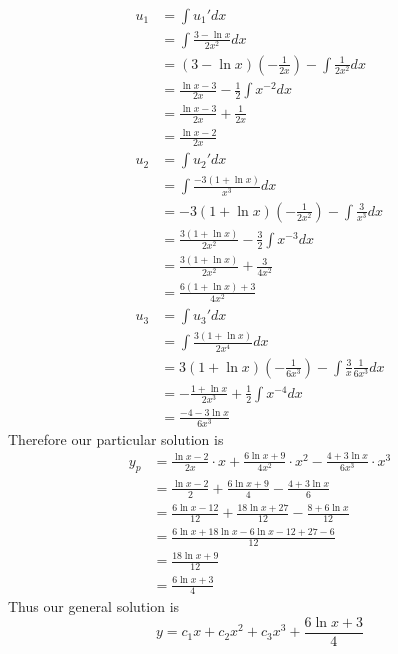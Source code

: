 \documentclass[openany]{report}
\begin{document}
\begin{align*}
    u_1 &= \int u_1'dx\\
    &= \int \frac{3-\ln x}{2x^2}dx\\
    &= (3-\ln x)\left(-\frac{1}{2x}\right) - \int \frac{1}{2x^2}dx\\
    &= \frac{\ln x - 3}{2x} - \frac{1}{2}\int x^{-2}dx\\
    &= \frac{\ln x - 3}{2x} + \frac{1}{2x}\\
    &= \frac{\ln x - 2}{2x}\\
    u_2 &= \int u_2'dx\\
    &= \int \frac{-3(1+\ln x)}{x^3}dx\\
    &= -3(1+\ln x)\left(-\frac{1}{2x^2}\right) - \int \frac{3}{x^3}dx\\
    &= \frac{3(1+\ln x)}{2x^2} - \frac{3}{2}\int x^{-3}dx\\
    &= \frac{3(1+ \ln x)}{2x^2} + \frac{3}{4x^2}\\
    &= \frac{6 (1 + \ln x) + 3 }{4x^2}\\
    u_3 &= \int u_3'dx\\
    &= \int \frac{3(1+\ln x)}{2x^4}dx\\
    &= 3(1 + \ln x) \left(-\frac{1}{6x^3}\right) - \int \frac{3}{x}\frac{1}{6x^3}dx\\
    &= -\frac{1 + \ln x}{2x^3} + \frac{1}{2}\int x^{-4}dx\\
    &= \frac{-4-3\ln x}{6x^3}
\end{align*}
Therefore our particular solution is
\begin{align*}
    y_p &= \frac{\ln x - 2}{2x} \cdot x + \frac{6\ln x + 9}{4x^2} \cdot x^2 - \frac{4 + 3 \ln x}{6x^3}\cdot x^3\\
    &= \frac{\ln x - 2}{2} + \frac{6\ln x + 9}{4} - \frac{4 + 3 \ln x}{6}\\
    &= \frac{6\ln x - 12}{12} + \frac{18\ln x + 27}{12} - \frac{8 + 6 \ln x}{12}\\
    &= \frac{6\ln x + 18 \ln x - 6 \ln x - 12 + 27 - 6}{12}\\
    &= \frac{18\ln x + 9}{12}\\
    &= \frac{6\ln x + 3}{4}
\end{align*}
Thus our general solution is 
\[y = c_1x + c_2x^2 + c_3x^3 + \frac{6\ln x + 3}{4}\]
\end{document}
